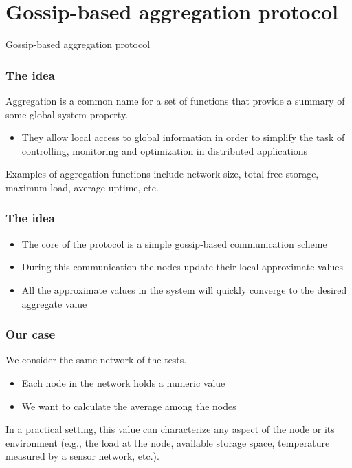 \documentclass{beamer}
\begin{document}
\section{Gossip-based aggregation protocol}

\begin{frame}[c]

\Huge{\centerline{Gossip-based aggregation protocol}}

\end{frame}


\begin{frame}
\frametitle{The idea}

Aggregation is a common name for a set of functions that provide a summary of some global system property. 

\begin{itemize}
  \item They allow local access to global information in order to simplify the task of controlling, monitoring and optimization in distributed applications
\end{itemize}

Examples of aggregation functions include network size, total free storage, maximum load, average uptime, etc.

\end{frame}

\begin{frame}
\frametitle{The idea}
\begin{itemize}
  \item The core of the protocol is a simple gossip-based communication scheme
  \item During this communication the nodes update their local approximate values
  \item All the approximate values in the system will quickly converge to the desired aggregate value
\end{itemize}
\end{frame}

\begin{frame}
\frametitle{Our case}
We consider the same network of the tests.
\begin{itemize}
  \item Each node in the network holds a numeric value
  \item We want to calculate the average among the nodes
\end{itemize}

In a practical setting, this value can characterize any aspect of the node or its environment (e.g., the load at the node, available storage space, temperature measured by a sensor network, etc.).

\end{frame}
\end{document}
